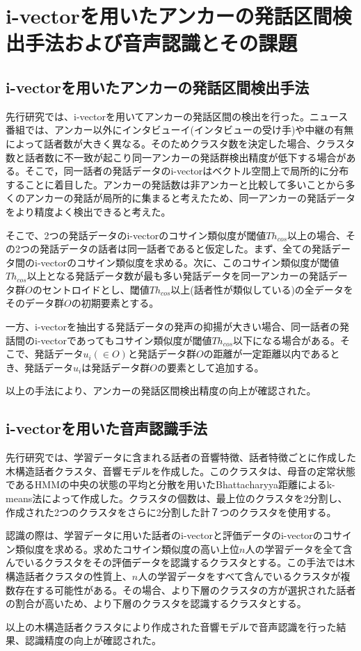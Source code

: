 \chapter{i-vectorを用いたアンカーの発話区間検出手法および音声認識とその課題}

\section{i-vectorを用いたアンカーの発話区間検出手法}
\label{section:clustering}
先行研究\cite{nozaki_gakuseikai}では、i-vectorを用いてアンカーの発話区間の検出を行った。ニュース番組では、アンカー以外にインタビューイ(インタビューの受け手)や中継の有無によって話者数が大きく異なる。そのためクラスタ数を決定した場合、クラスタ数と話者数に不一致が起こり同一アンカーの発話群検出精度が低下する場合がある。そこで，同一話者の発話データのi-vectorはベクトル空間上で局所的に分布することに着目した。アンカーの発話数は非アンカーと比較して多いことから多くのアンカーの発話が局所的に集まると考えたため、同一アンカーの発話データをより精度よく検出できると考えた。\par
そこで、2つの発話データのi-vectorのコサイン類似度が閾値$Th_{cos}$以上の場合、その2つの発話データの話者は同一話者であると仮定した。まず、全ての発話データ間のi-vectorのコサイン類似度を求める。次に、このコサイン類似度が閾値$Th_{cos}$以上となる発話データ数が最も多い発話データを同一アンカーの発話データ群$O$のセントロイドとし、閾値$Th_{cos}$以上(話者性が類似している)の全データをそのデータ群$O$の初期要素とする。\par
一方、i-vectorを抽出する発話データの発声の抑揚が大きい場合、同一話者の発話間のi-vectorであってもコサイン類似度が閾値$Th_{cos}$以下になる場合がある。そこで、発話データ$u_i(\in O)$と発話データ群$O$の距離が一定距離以内であるとき、発話データ$u_i$は発話データ群$O$の要素として追加する。\par
以上の手法により、アンカーの発話区間検出精度の向上が確認された。

\section{i-vectorを用いた音声認識手法}
\label{section:yoshimura_pre_clustering}
先行研究\cite{yoshimura_clustering}では、学習データに含まれる話者の音響特徴、話者特徴ごとに作成した木構造話者クラスタ、音響モデルを作成した。このクラスタは、母音の定常状態であるHMMの中央の状態の平均と分散を用いたBhattacharyya距離によるk-means法によって作成した。クラスタの個数は、最上位のクラスタを2分割し、作成された2つのクラスタをさらに2分割した計７つのクラスタを使用する。\par
認識の際は、学習データに用いた話者のi-vectorと評価データのi-vectorのコサイン類似度を求める。求めたコサイン類似度の高い上位$n$人の学習データを全て含んでいるクラスタをその評価データを認識するクラスタとする。この手法では木構造話者クラスタの性質上、$n$人の学習データをすべて含んでいるクラスタが複数存在する可能性がある。その場合、より下層のクラスタの方が選択された話者の割合が高いため、より下層のクラスタを認識するクラスタとする。\par
以上の木構造話者クラスタにより作成された音響モデルで音声認識を行った結果、認識精度の向上が確認された。

